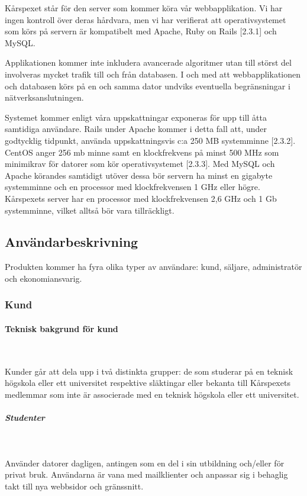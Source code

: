 \documentclass[a4paper, twoside, 11pt, titlepage]{article}
\begin{document}
		Kårspexet står för den server som kommer köra vår webbapplikation. Vi har ingen kontroll över deras hårdvara, men vi har verifierat att operativsystemet som körs på servern är kompatibelt med Apache, Ruby on Rails [2.3.1] och MySQL.

		Applikationen kommer inte inkludera avancerade algoritmer utan till störst del involveras mycket trafik till och från databasen. I och med att webbapplikationen och databasen körs på en och samma dator undviks eventuella begränsningar i nätverksanslutningen.

		Systemet kommer enligt våra uppskattningar exponeras för upp till åtta samtidiga användare. Rails under Apache kommer i detta fall att, under godtycklig tidpunkt, använda uppskattningsvis c:a 250 MB systemminne [2.3.2]. CentOS anger 256 mb minne samt en klockfrekvens på minst 500 MHz som minimikrav för datorer som kör operativsystemet [2.3.3]. Med MySQL och Apache körandes samtidigt utöver dessa bör servern ha minst en gigabyte systemminne och en processor med klockfrekvensen 1 GHz eller högre. Kårspexets server har en processor med klockfrekvensen 2,6 GHz och 1 Gb systemminne, vilket alltså bör vara tillräckligt.

	\subsection{Användarbeskrivning}


	Produkten kommer ha fyra olika typer av användare: kund, säljare, administratör och ekonomiansvarig.

		\subsubsection{Kund}



			\paragraph{Teknisk bakgrund för kund}\

			Kunder går att dela upp i två distinkta grupper: de som studerar på en teknisk högskola eller ett universitet respektive släktingar eller bekanta till Kårspexets medlemmar som inte är associerade med en teknisk högskola eller ett universitet.

			\subparagraph{\emph{Studenter}}\

				Använder datorer dagligen, antingen som en del i sin utbildning och/eller för privat bruk. Användarna är vana med mailklienter och anpassar sig i behaglig takt till nya webbsidor och gränssnitt.
\end{document}
